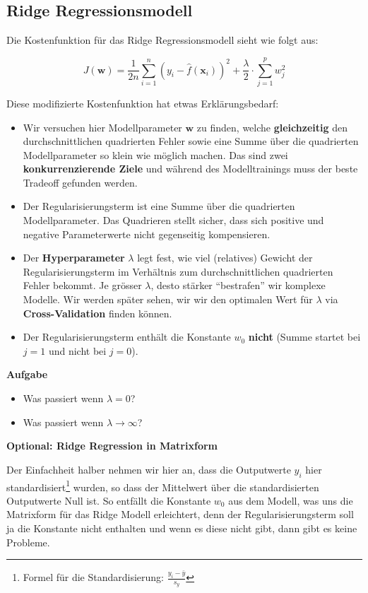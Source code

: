\documentclass[
]{book}
\providecommand{\tightlist}{%
  \setlength{\itemsep}{0pt}\setlength{\parskip}{0pt}}
\begin{document}
\hypertarget{ridge-regressionsmodell}{%
\subsection{Ridge Regressionsmodell}\label{ridge-regressionsmodell}}

Die Kostenfunktion für das Ridge Regressionsmodell sieht wie folgt aus:

\[
J(\mathbf{w}) = \frac{1}{2n} \sum_{i=1}^{n} \left(y_i - \hat{f}(\mathbf{x}_i) \right)^2 + \frac{\lambda}{2} \cdot \sum_{j=1}^p w_j^2
\]

Diese modifizierte Kostenfunktion hat etwas Erklärungsbedarf:

\begin{itemize}
\tightlist
\item
  Wir versuchen hier Modellparameter \(\mathbf{w}\) zu finden, welche \textbf{gleichzeitig} den durchschnittlichen quadrierten Fehler sowie eine Summe über die quadrierten Modellparameter so klein wie möglich machen. Das sind zwei \textbf{konkurrenzierende Ziele} und während des Modelltrainings muss der beste Tradeoff gefunden werden.
\item
  Der Regularisierungsterm ist eine Summe über die quadrierten Modellparameter. Das Quadrieren stellt sicher, dass sich positive und negative Parameterwerte nicht gegenseitig kompensieren.
\item
  Der \textbf{Hyperparameter} \(\lambda\) legt fest, wie viel (relatives) Gewicht der Regularisierungsterm im Verhältnis zum durchschnittlichen quadrierten Fehler bekommt. Je grösser \(\lambda\), desto stärker ``bestrafen'' wir komplexe Modelle. Wir werden später sehen, wir wir den optimalen Wert für \(\lambda\) via \textbf{Cross-Validation} finden können.
\item
  Der Regularisierungsterm enthält die Konstante \(w_0\) \textbf{nicht} (Summe startet bei \(j=1\) und nicht bei \(j=0\)).
\end{itemize}

\textbf{Aufgabe}

\begin{itemize}
\tightlist
\item
  Was passiert wenn \(\lambda=0\)?
\item
  Was passiert wenn \(\lambda \rightarrow \infty\)?
\end{itemize}

\textbf{Optional: Ridge Regression in Matrixform}

Der Einfachheit halber nehmen wir hier an, dass die Outputwerte \(y_i\) hier standardisiert\footnote{Formel für die Standardisierung: \(\frac{y_i-\bar{y}}{s_y}\)} wurden, so dass der Mittelwert über die standardisierten Outputwerte Null ist. So entfällt die Konstante \(w_0\) aus dem Modell, was uns die Matrixform für das Ridge Modell erleichtert, denn der Regularisierungsterm soll ja die Konstante nicht enthalten und wenn es diese nicht gibt, dann gibt es keine Probleme.
\end{document}

